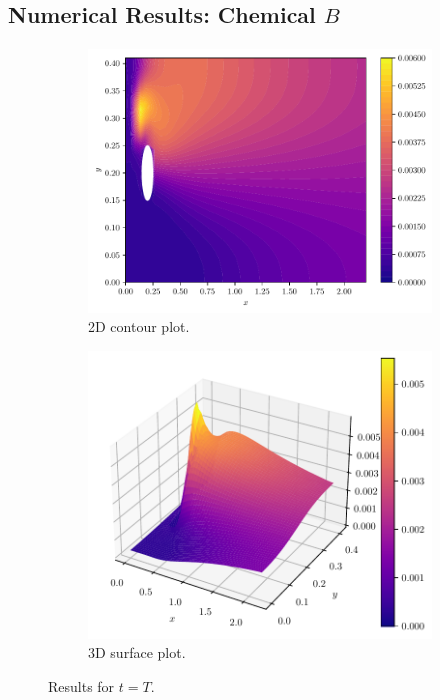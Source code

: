 \documentclass{beamer}
\theoremstyle{definition}
\theoremstyle{remark}
\theoremstyle{example}
\newif\ifinsection
\newif\ifinsubsection
\let\oldsubsection\subsection
\renewcommand{\subsection}{
  \global\insubsectiontrue
  \oldsubsection}
\newcommand {\aframe}[1] {
  \begin{frame}
    \ifinsection\frametitle{\secname}\fi
    \ifinsubsection\framesubtitle{\subsecname}\fi
  #1
  \end{frame}
}
\begin{document}
\subsection{Numerical Results: Chemical $B$}
\aframe{
  \begin{figure}
    \begin{subfigure}[b]{0.45\textwidth}
      \centering \includegraphics[width=\textwidth]{figs/b-chemical-2d.pdf}
      \caption{2D contour plot.}
    \end{subfigure}
    \begin{subfigure}[b]{0.53\textwidth}
      \centering \includegraphics[width=\textwidth]{figs/b-chemical-3d.pdf}
      \caption{3D surface plot.}
    \end{subfigure}
    \caption{Results for $t=T$.}
  \end{figure}
}
\end{document}
